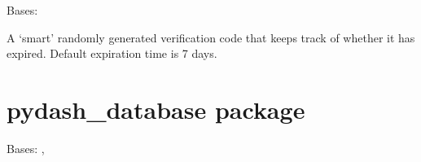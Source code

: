 \documentclass[letterpaper,10pt,english]{sphinxmanual}
\begin{document}
\begin{fulllineitems}
\label{\detokenize{pydash_app.user.verification_code:pydash_app.user.verification_code.VerificationCode}}
Bases: 

A ‘smart’ randomly generated verification code that keeps track of whether it has expired.
Default expiration time is 7 days.

\begin{fulllineitems}
\label{\detokenize{pydash_app.user.verification_code:pydash_app.user.verification_code.VerificationCode.is_expired}}
\end{fulllineitems}


\end{fulllineitems}



\section{pydash\_database package}
\label{\detokenize{pydash_database:module-pydash_database}}\label{\detokenize{pydash_database:pydash-database-package}}\label{\detokenize{pydash_database::doc}}

\begin{fulllineitems}
\label{\detokenize{pydash_database:pydash_database.MultiIndexedPersistentCollection}}
Bases: , 

\end{fulllineitems}


\begin{fulllineitems}
\label{\detokenize{pydash_database:pydash_database.database_connection}}
\end{fulllineitems}
\end{document}
